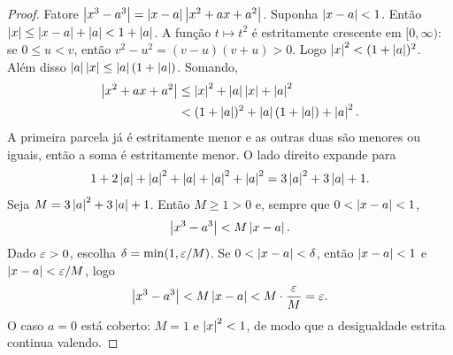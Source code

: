 \documentclass[11pt,a4paper]{article}
\begin{document}
\begin{proof}
Fatore $\abs{x^3-a^3}=\abs{x-a}\abs{x^2+ax+a^2}$. Suponha $\abs{x-a}<1$. Ent\~ao $\abs{x}\le \abs{x-a}+\abs{a}<1+\abs{a}$. A fun\c{c}\~ao $t\mapsto t^2$ \'e estritamente crescente em $[0,\infty)$: se $0\le u<v$, ent\~ao $v^2-u^2=(v-u)(v+u)>0$. Logo $\abs{x}^2<(1+\abs{a})^2$. Al\'em disso $\abs{a}\abs{x}\le \abs{a}(1+\abs{a})$. Somando,
\begin{align*}
\abs{x^2+ax+a^2}
&\le \abs{x}^2+\abs{a}\abs{x}+\abs{a}^2\\
&<(1+\abs{a})^2+\abs{a}(1+\abs{a})+\abs{a}^2.
\end{align*}
A primeira parcela j\'a \'e estritamente menor e as outras duas s\~ao menores ou iguais, ent\~ao a soma \'e estritamente menor. O lado direito expande para
\[
1+2\abs{a}+\abs{a}^2+\abs{a}+\abs{a}^2+\abs{a}^2=3\abs{a}^2+3\abs{a}+1.
\]
Seja $M=3\abs{a}^2+3\abs{a}+1$. Ent\~ao $M\ge 1>0$ e, sempre que $0<\abs{x-a}<1$,
\[
\abs{x^3-a^3}<M\abs{x-a}.
\]
Dado $\eps>0$, escolha $\delta=\min(1,\eps/M)$. Se $0<\abs{x-a}<\delta$, ent\~ao $\abs{x-a}<1$ e $\abs{x-a}<\eps/M$, logo
\[
\abs{x^3-a^3}<M\abs{x-a}<M\cdot\frac{\eps}{M}=\eps.
\]
O caso $a=0$ est\'a coberto: $M=1$ e $\abs{x}^2<1$, de modo que a desigualdade estrita continua valendo.
\end{proof}
\end{document}
